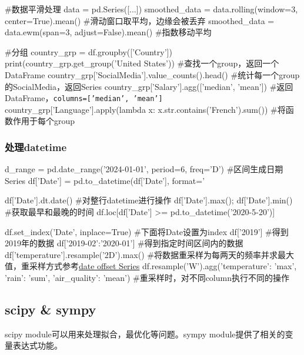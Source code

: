 \begin{codeblock}[language=python, caption={Perform statistical operations using DataFrame}]
        #数据平滑处理
        data = pd.Series([...])
        smoothed_data = data.rolling(window=3, center=True).mean() #滑动窗口取平均，边缘会被丢弃
        smoothed_data = data.ewm(span=3, adjust=False).mean() #指数移动平均 

        #分组
        country_grp = df.groupby(['Country'])
        print(country_grp.get_group('United States')) #查找一个group，返回一个DataFrame
        country_grp['SocialMedia'].value_counts().head() 
            #统计每一个group的SocialMedia，返回Series
        country_grp['Salary'].agg(['median', 'mean']) 
            #返回DataFrame，\texttt{columns=['median', 'mean']}
        country_grp['Language'].apply(lambda x: x.str.contains('French').sum())
            #将函数作用于每个group
      \end{codeblock}

    \subsubsection{处理datetime}
      \begin{codeblock}[language=python, caption={datetime in pandas}]
        d_range = pd.date_range('2024-01-01', period=6, freq='D') #区间生成日期Series
        df['Date'] = pd.to_datetime(df['Date'], format='%

        df['Date'].dt.date() #对整行datetime进行操作
        df['Date'].max(); df['Date'].min() #获取最早和最晚的时间
        df.loc[df['Date'] >= pd.to_datetime('2020-5-20')]

        df.set_index('Date', inplace=True) #下面将Date设置为index
        df['2019'] #得到2019年的数据
        df['2019-02':'2020-01'] #得到指定时间区间内的数据
        df['temperature'].resample('2D').max() 
            #将数据重采样为每两天的频率并求最大值，重采样方式参考\href{https://pandas.pydata.org/docs/user_guide/timeseries.html\#dateoffset-objects}{\underline{{date offset Series}}}
        df.resample('W').agg({'temperature': 'max', 'rain': 'sum', 'air_quality': 'mean'}) 
            #重采样时，对不同column执行不同的操作
      \end{codeblock}

  \subsection{scipy \& sympy}
    scipy module可以用来处理拟合，最优化等问题。sympy module提供了相关的变量表达式功能。

